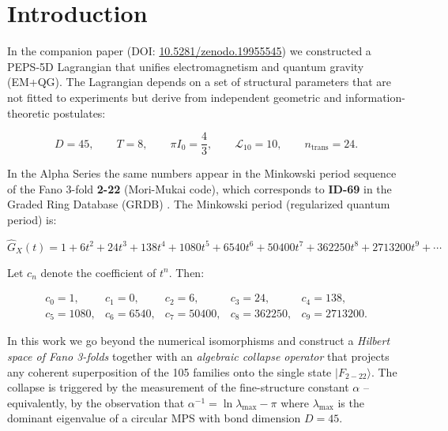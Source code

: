 \documentclass[12pt]{article}
\begin{document}
\tableofcontents

\newpage

\section{Introduction}

In the companion paper \cite{peps5d} (DOI: \href{https://doi.org/10.5281/zenodo.19955545}{10.5281/zenodo.19955545})
we constructed a PEPS-5D Lagrangian that unifies electromagnetism and quantum
gravity (EM+QG). The Lagrangian depends on a set of structural parameters that
are not fitted to experiments but derive from independent geometric and
information-theoretic postulates:

\begin{equation}
\boxed{
D = 45,\qquad T = 8,\qquad \pi I_0 = \frac{4}{3},\qquad \mathcal{L}_{10} = 10,\qquad n_{\text{trans}} = 24.
}
\label{eq:params}
\end{equation}

In the Alpha Series \cite{alpha_series} the same numbers appear in the
Minkowski period sequence of the Fano 3-fold \textbf{2-22} (Mori-Mukai code),
which corresponds to \textbf{ID-69} in the Graded Ring Database (GRDB)
\cite{coates2013,grdb}. The Minkowski period (regularized quantum period) is:

\begin{equation}
\widehat{G}_X(t) = 1 + 6t^2 + 24t^3 + 138t^4 + 1080t^5 + 6540t^6 + 50400t^7 + 362250t^8 + 2713200t^9 + \cdots
\label{eq:minkowski}
\end{equation}

Let \(c_n\) denote the coefficient of \(t^n\). Then:

\begin{equation}
\begin{array}{lllll}
c_0 = 1,      & c_1 = 0,      & c_2 = 6,      & c_3 = 24,     & c_4 = 138,   \\
c_5 = 1080,   & c_6 = 6540,   & c_7 = 50400,  & c_8 = 362250, & c_9 = 2713200.
\end{array}
\label{eq:coefficients}
\end{equation}

In this work we go beyond the numerical isomorphisms and construct a
\emph{Hilbert space of Fano 3-folds} together with an \emph{algebraic collapse
operator} that projects any coherent superposition of the 105 families onto the
single state \(|F_{2-22}\rangle\). The collapse is triggered by the measurement
of the fine-structure constant \(\alpha\) – equivalently, by the observation that
\(\alpha^{-1} = \ln\lambda_{\max} - \pi\) where \(\lambda_{\max}\) is the dominant
eigenvalue of a circular MPS with bond dimension \(D=45\).
\end{document}
